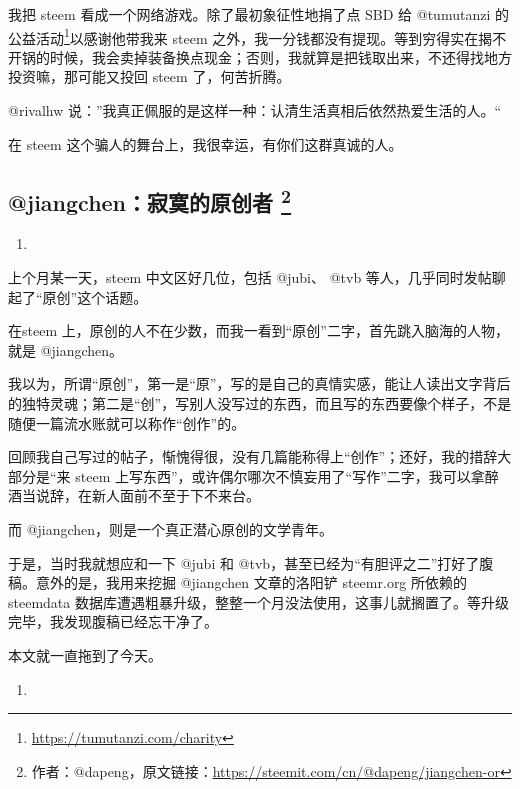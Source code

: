 \documentclass[]{ctexbook}
\renewcommand{\href}[2]{#2\footnote{\url{#1}}}
\begin{document}
我把 steem 看成一个网络游戏。除了最初象征性地捐了点 SBD 给 @tumutanzi 的\href{https://tumutanzi.com/charity}{公益活动}以感谢他带我来 steem 之外，我一分钱都没有提现。等到穷得实在揭不开锅的时候，我会卖掉装备换点现金；否则，我就算是把钱取出来，不还得找地方投资嘛，那可能又投回 steem 了，何苦折腾。

@rivalhw 说：''我真正佩服的是这样一种：认清生活真相后依然热爱生活的人。``

在 steem 这个骗人的舞台上，我很幸运，有你们这群真诚的人。

\hypertarget{jiangchen}{%
\subsection[@jiangchen：寂寞的原创者 ]{\texorpdfstring{@jiangchen：寂寞的原创者 \footnote{作者：@dapeng，原文链接：\url{https://steemit.com/cn/@dapeng/jiangchen-or}}}{@jiangchen：寂寞的原创者 }}\label{jiangchen}}

\begin{enumerate}
\def\labelenumi{(\arabic{enumi})}
\item
\end{enumerate}

上个月某一天，steem 中文区好几位，包括 @jubi、 @tvb 等人，几乎同时发帖聊起了``原创''这个话题。

在steem 上，原创的人不在少数，而我一看到``原创''二字，首先跳入脑海的人物，就是 @jiangchen。

我以为，所谓``原创''，第一是``原''，写的是自己的真情实感，能让人读出文字背后的独特灵魂；第二是``创''，写别人没写过的东西，而且写的东西要像个样子，不是随便一篇流水账就可以称作``创作''的。

回顾我自己写过的帖子，惭愧得很，没有几篇能称得上``创作''；还好，我的措辞大部分是``来 steem 上写东西''，或许偶尔哪次不慎妄用了``写作''二字，我可以拿醉酒当说辞，在新人面前不至于下不来台。

而 @jiangchen，则是一个真正潜心原创的文学青年。

于是，当时我就想应和一下 @jubi 和 @tvb，甚至已经为``有胆评之二''打好了腹稿。意外的是，我用来挖掘 @jiangchen 文章的洛阳铲 steemr.org 所依赖的 steemdata 数据库遭遇粗暴升级，整整一个月没法使用，这事儿就搁置了。等升级完毕，我发现腹稿已经忘干净了。

本文就一直拖到了今天。

\begin{enumerate}
\def\labelenumi{(\arabic{enumi})}
\setcounter{enumi}{1}
\item
\end{enumerate}
\end{document}
